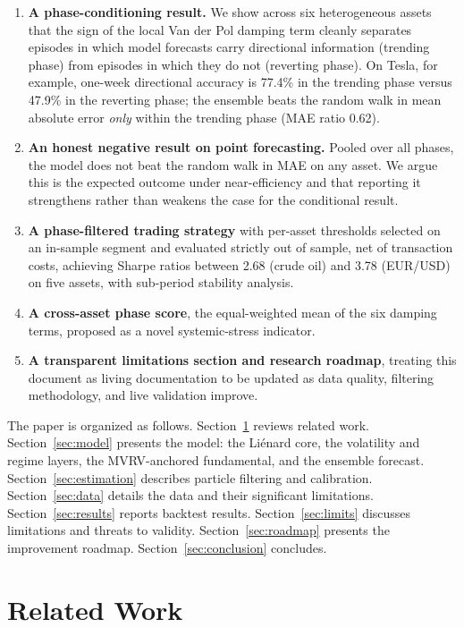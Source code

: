 \documentclass[11pt,a4paper]{article}
\begin{document}
\begin{enumerate}
\item \textbf{A phase-conditioning result.} We show across six heterogeneous assets that the sign of the local Van der Pol damping term cleanly separates episodes in which model forecasts carry directional information (trending phase) from episodes in which they do not (reverting phase). On Tesla, for example, one-week directional accuracy is 77.4\% in the trending phase versus 47.9\% in the reverting phase; the ensemble beats the random walk in mean absolute error \emph{only} within the trending phase (MAE ratio 0.62).
\item \textbf{An honest negative result on point forecasting.} Pooled over all phases, the model does not beat the random walk in MAE on any asset. We argue this is the expected outcome under near-efficiency and that reporting it strengthens rather than weakens the case for the conditional result.
\item \textbf{A phase-filtered trading strategy} with per-asset thresholds selected on an in-sample segment and evaluated strictly out of sample, net of transaction costs, achieving Sharpe ratios between 2.68 (crude oil) and 3.78 (EUR/USD) on five assets, with sub-period stability analysis.
\item \textbf{A cross-asset phase score}, the equal-weighted mean of the six damping terms, proposed as a novel systemic-stress indicator.
\item \textbf{A transparent limitations section and research roadmap}, treating this document as living documentation to be updated as data quality, filtering methodology, and live validation improve.
\end{enumerate}

The paper is organized as follows. Section~\ref{sec:related} reviews related work. Section~\ref{sec:model} presents the model: the Li\'enard core, the volatility and regime layers, the MVRV-anchored fundamental, and the ensemble forecast. Section~\ref{sec:estimation} describes particle filtering and calibration. Section~\ref{sec:data} details the data and their significant limitations. Section~\ref{sec:results} reports backtest results. Section~\ref{sec:limits} discusses limitations and threats to validity. Section~\ref{sec:roadmap} presents the improvement roadmap. Section~\ref{sec:conclusion} concludes.

\section{Related Work}\label{sec:related}
\end{document}
